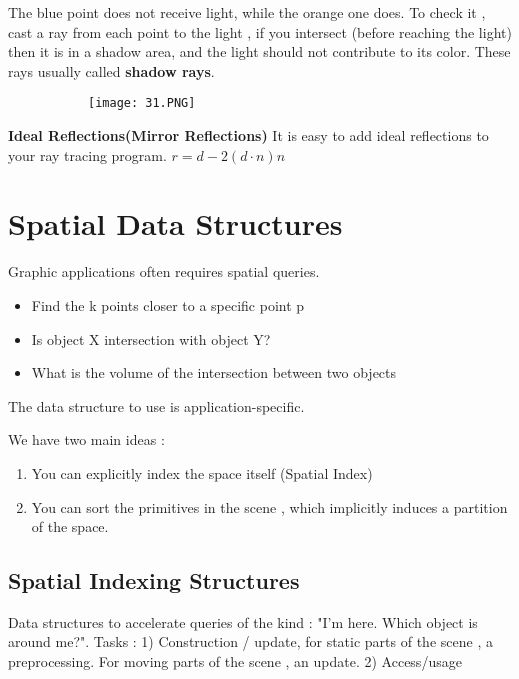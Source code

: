 \documentclass{article}
\begin{document}
The blue point does not receive light, while the orange one does. To check it , cast a ray from each point to the light , if you intersect (before reaching the light) then it is in a shadow area, and the light should not contribute to its color.
These rays usually called \textbf{shadow rays}.

\begin{figure}[ht!]
  \centering
  \begin{subfigure}[b]{0.3\linewidth}
    \texttt{[image: 31.PNG]}
  \end{subfigure}
\end{figure}

\vspace{3mm}
\textbf{Ideal Reflections(Mirror Reflections)}
It is easy to add ideal reflections to your ray tracing program.
$r = d - 2(d \cdot n) n$

\section{Spatial Data Structures}

Graphic applications often requires spatial queries.
\begin{itemize}
    \item Find the k points closer to a specific point p
    \item Is object X intersection with object Y?
    \item What is the volume of the intersection between two objects
\end{itemize}
The data structure to use is application-specific.

We have two main ideas : 
\begin{enumerate}
    \item You can explicitly index the space itself (Spatial Index)
    \item You can sort the primitives in the scene , which implicitly induces a partition of the space.
\end{enumerate}

\subsection{Spatial Indexing Structures}

Data structures to accelerate queries of the kind : "I'm here. Which object is around me?". Tasks : 1) Construction / update, for static parts of the scene , a preprocessing. For moving parts of the scene , an update. 2) Access/usage
\end{document}
